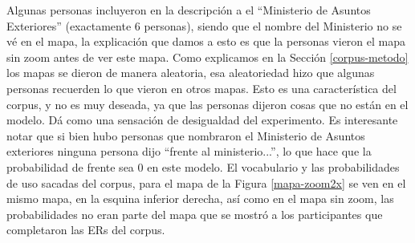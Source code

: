 
Algunas personas incluyeron en la descripci\'on a el ``Ministerio de Asuntos Exteriores'' (exactamente 6 personas), siendo que el nombre del Ministerio no se v\'e en el mapa, la explicaci\'on que damos a esto es que la personas vieron el mapa sin zoom antes de ver este mapa. Como explicamos en la Secci\'on \ref{corpus-metodo} los mapas se dieron de manera aleatoria, esa aleatoriedad hizo que algunas personas recuerden lo que vieron en otros mapas. Esto es una caracter\'istica del corpus, y no es muy deseada, ya que las personas dijeron cosas que no est\'an en el modelo. D\'a como una sensaci\'on de desigualdad del experimento.
Es interesante notar que si bien hubo personas que nombraron el Ministerio de Asuntos exteriores ninguna persona dijo ``frente al ministerio...'', lo que hace que la probabilidad de frente sea 0 en este modelo.
El vocabulario y las probabilidades de uso sacadas del corpus, para el mapa de la Figura \ref{mapa-zoom2x} se ven en el mismo mapa, en la esquina inferior derecha, as\'i como en el mapa sin zoom, las probabilidades no eran parte del mapa que se mostr\'o a los participantes que completaron las ERs del corpus.

